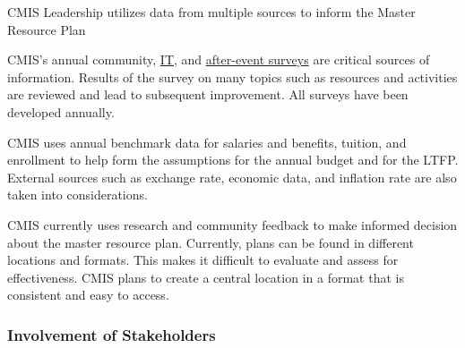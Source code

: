 \begin{findings}
CMIS Leadership utilizes data from multiple sources to inform the Master Resource Plan

CMIS’s annual community, \href{https://docs.google.com/forms/d/e/1FAIpQLSdPiMWntLfKwp7ZHpiOoIshADmvSlH50TI0Mi_RVzvtcOnDoQ/viewform?c=0&w=1}{IT}, and \href{https://drive.google.com/drive/u/0/folders/0B7w2qeag9D8cT0J0YlFlUDdnMXc}{after-event surveys} are critical sources of information. Results of the survey on many topics such as  resources and activities are reviewed and lead to subsequent improvement. All surveys have been developed annually.

CMIS uses annual benchmark data for salaries and benefits, tuition, and enrollment to help form the assumptions for the annual budget and for the LTFP. External sources such as exchange rate, economic data, and inflation rate are also taken into considerations.


CMIS currently uses research and community feedback to make informed decision about the master resource plan.
Currently, plans can be found in different locations and formats. This makes it difficult to evaluate and assess for effectiveness. CMIS plans to create a central location in a format that is consistent and easy to access.
\end{findings}

\subsubsection{Involvement of Stakeholders}



